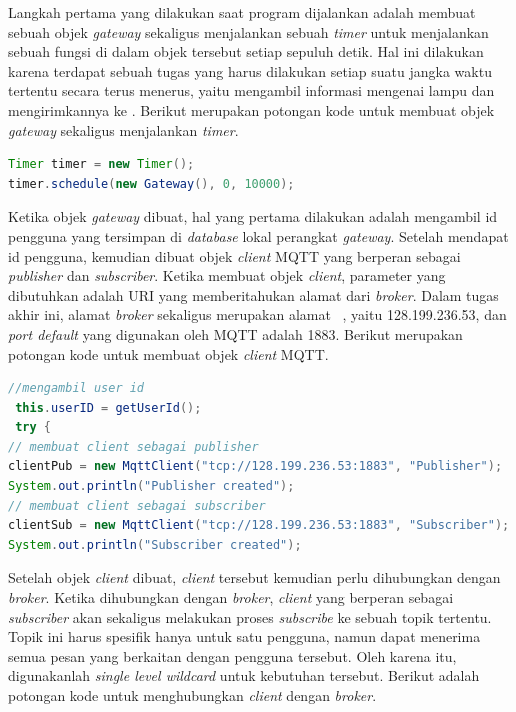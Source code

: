 Langkah pertama yang dilakukan saat program dijalankan adalah membuat sebuah objek \textit{gateway} sekaligus menjalankan sebuah \textit{timer} untuk menjalankan sebuah fungsi di dalam objek tersebut setiap sepuluh detik. Hal ini dilakukan karena terdapat sebuah tugas yang harus dilakukan setiap suatu jangka waktu tertentu secara terus menerus, yaitu mengambil informasi mengenai lampu dan mengirimkannya ke \plat. Berikut merupakan potongan kode untuk membuat objek \textit{gateway} sekaligus menjalankan \textit{timer}.

\begin{lstlisting}[language=Java,label=code:timer,caption=Membuat objek \textit{gateway}]
Timer timer = new Timer();
timer.schedule(new Gateway(), 0, 10000);
\end{lstlisting}

Ketika objek \textit{gateway} dibuat, hal yang pertama dilakukan adalah mengambil id pengguna yang tersimpan di \textit{database} lokal perangkat \textit{gateway}. Setelah mendapat id pengguna, kemudian dibuat objek \textit{client} MQTT yang berperan sebagai \textit{publisher} dan \textit{subscriber}. Ketika membuat objek \textit{client}, parameter yang dibutuhkan adalah URI yang memberitahukan alamat dari \textit{broker}. Dalam tugas akhir ini, alamat \textit{broker} sekaligus merupakan alamat \plat~, yaitu 128.199.236.53, dan \textit{port default} yang digunakan oleh MQTT adalah 1883. Berikut merupakan potongan kode untuk membuat objek \textit{client} MQTT.

 \begin{lstlisting}[language=Java,label=code:client,caption=Membuat objek \textit{client} MQTT]
 //mengambil user id
 this.userID = getUserId();
 try {
// membuat client sebagai publisher
clientPub = new MqttClient("tcp://128.199.236.53:1883", "Publisher");
System.out.println("Publisher created");
// membuat client sebagai subscriber
clientSub = new MqttClient("tcp://128.199.236.53:1883", "Subscriber");
System.out.println("Subscriber created");
 \end{lstlisting}
 
 Setelah objek \textit{client} dibuat, \textit{client} tersebut kemudian perlu dihubungkan dengan \textit{broker}. Ketika dihubungkan dengan \textit{broker}, \textit{client} yang berperan sebagai \textit{subscriber} akan sekaligus melakukan proses \textit{subscribe} ke sebuah topik tertentu. Topik ini harus spesifik hanya untuk satu pengguna, namun dapat menerima semua pesan yang berkaitan dengan pengguna tersebut. Oleh karena itu, digunakanlah \textit{single level wildcard} untuk kebutuhan tersebut. Berikut adalah potongan kode untuk menghubungkan \textit{client} dengan \textit{broker}.
 
